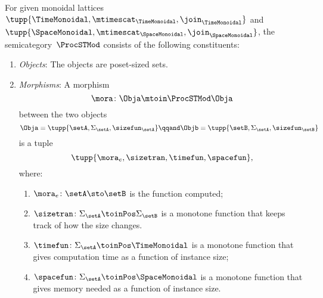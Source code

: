 \begin{definition}
    \label{def:ProcSTMod}
    For given monoidal lattices~$\tupp{\TimeMonoidal, \mtimescat_{\TimeMonoidal}, \join_{\TimeMonoidal}}$ and~$\tupp{\SpaceMonoidal, \mtimescat_{\SpaceMonoidal}, \join_{\SpaceMonoidal}}$, the semicategory~$\ProcSTMod$ consists of the following constituents:
    \begin{enumerate}
        \item \emph{Objects}: The objects are poset-sized sets.
        \item \emph{Morphisms}: A morphism
              \begin{equation}
                  \mora \colon \Obja \mtoin\ProcSTMod \Obja
              \end{equation}
              between the two objects
              \begin{equation}
                  \Obja = \tupp{\setA, \Sigma_{\setA}, \sizefun_{\setA}}
                  \qqand
                  \Objb = \tupp{\setB, \Sigma_{\setA}, \sizefun_{\setB}}
              \end{equation}
              is a tuple
              \begin{equation}
                  \tupp{\mora_e, \sizetran, \timefun, \spacefun },
              \end{equation}
              where:
              \begin{enumerate}
                  \item $\mora_e \colon \setA \sto \setB$ is the function computed;
                  \item $\sizetran\colon \Sigma_{\setA} \toinPos \Sigma_{\setB}$ is a monotone function that keeps track of how the size changes.
                  \item $\timefun\colon \Sigma_{\setA} \toinPos \TimeMonoidal$ is a monotone function that gives computation time as a function of instance size;
                  \item $\spacefun\colon \Sigma_{\setA} \toinPos \SpaceMonoidal$ is a monotone function that gives memory needed as a function of instance size.
              \end{enumerate}


\end{enumerate}
\end{definition}
